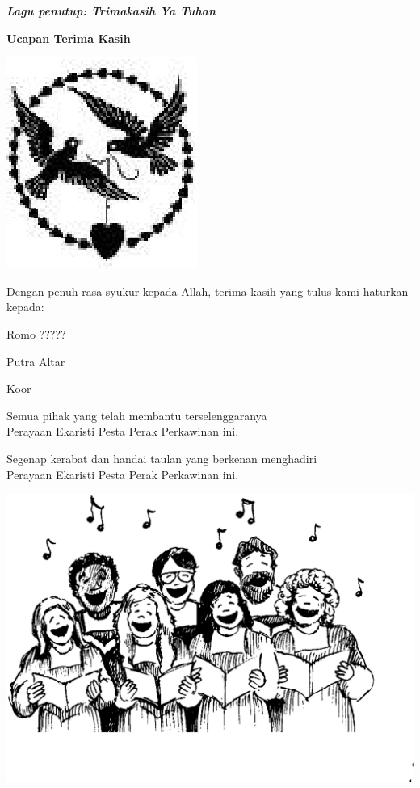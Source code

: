 \documentclass[12pt,two pages]{scrbook}
\makeatletter
\newcommand{\judul}[1]{%
  {\parindent \z@ \centering \normalfont
    \interlinepenalty\@M \Large \bfseries #1\par\nobreak \vskip 20\p@ }}
\newcommand{\lagu}[1]{%
  {\parindent \z@ \normalfont
    \interlinepenalty\@M \bfseries \emph{#1}\par\nobreak \vskip 20\p@ }}
\newcommand{\romo}{????? }
\makeatother
\begin{document}
\lagu{Lagu penutup: Trimakasih Ya Tuhan}
\newpage
\thispagestyle{empty}
\judul{Ucapan Terima Kasih}
\begin{center}
\includegraphics{images}

Dengan penuh rasa syukur kepada Allah, terima kasih yang tulus kami haturkan kepada:

Romo \romo \vspace{0.5cm}

Putra Altar\vspace{0.5cm}

Koor \vspace{0.5cm}

Semua pihak yang telah membantu terselenggaranya \\
Perayaan Ekaristi Pesta Perak Perkawinan ini.\vspace{0.5cm}

Segenap kerabat dan handai taulan yang berkenan menghadiri\\
Perayaan Ekaristi Pesta Perak Perkawinan ini.

\includegraphics[scale=0.2]{choir01}
\end{center}
\end{document}

